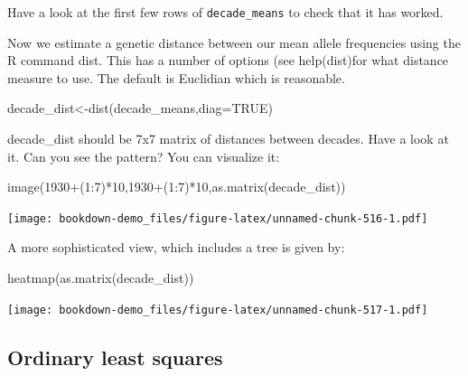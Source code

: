 \documentclass[
]{book}
\newenvironment{Shaded}{\begin{snugshade}}{\end{snugshade}}
\newcommand{\AttributeTok}[1]{\textcolor[rgb]{0.77,0.63,0.00}{#1}}
\newcommand{\ConstantTok}[1]{\textcolor[rgb]{0.00,0.00,0.00}{#1}}
\newcommand{\DecValTok}[1]{\textcolor[rgb]{0.00,0.00,0.81}{#1}}
\newcommand{\FunctionTok}[1]{\textcolor[rgb]{0.00,0.00,0.00}{#1}}
\newcommand{\NormalTok}[1]{#1}
\newcommand{\OtherTok}[1]{\textcolor[rgb]{0.56,0.35,0.01}{#1}}
\newcommand{\SpecialCharTok}[1]{\textcolor[rgb]{0.00,0.00,0.00}{#1}}
\begin{document}
Have a look at the first few rows of \texttt{decade\_means} to check that it has worked.

Now we estimate a genetic distance between our mean allele frequencies using the R command dist. This has a number of options (see help(dist)for what distance measure to use. The default is Euclidian which is reasonable.

\begin{Shaded}
\begin{Highlighting}[]
\NormalTok{decade\_dist}\OtherTok{\textless{}{-}}\FunctionTok{dist}\NormalTok{(decade\_means,}\AttributeTok{diag=}\ConstantTok{TRUE}\NormalTok{)}
\end{Highlighting}
\end{Shaded}

decade\_dist should be 7x7 matrix of distances between decades. Have a look at it. Can you
see the pattern? You can visualize it:

\begin{Shaded}
\begin{Highlighting}[]
\FunctionTok{image}\NormalTok{(}\DecValTok{1930}\SpecialCharTok{+}\NormalTok{(}\DecValTok{1}\SpecialCharTok{:}\DecValTok{7}\NormalTok{)}\SpecialCharTok{*}\DecValTok{10}\NormalTok{,}\DecValTok{1930}\SpecialCharTok{+}\NormalTok{(}\DecValTok{1}\SpecialCharTok{:}\DecValTok{7}\NormalTok{)}\SpecialCharTok{*}\DecValTok{10}\NormalTok{,}\FunctionTok{as.matrix}\NormalTok{(decade\_dist))}
\end{Highlighting}
\end{Shaded}

\texttt{[image: bookdown-demo\_files/figure-latex/unnamed-chunk-516-1.pdf]}

A more sophisticated view, which includes a tree is given by:

\begin{Shaded}
\begin{Highlighting}[]
\FunctionTok{heatmap}\NormalTok{(}\FunctionTok{as.matrix}\NormalTok{(decade\_dist))}
\end{Highlighting}
\end{Shaded}

\texttt{[image: bookdown-demo\_files/figure-latex/unnamed-chunk-517-1.pdf]}

\hypertarget{ordinary-least-squares}{%
\subsection{Ordinary least squares}\label{ordinary-least-squares}}
\end{document}
